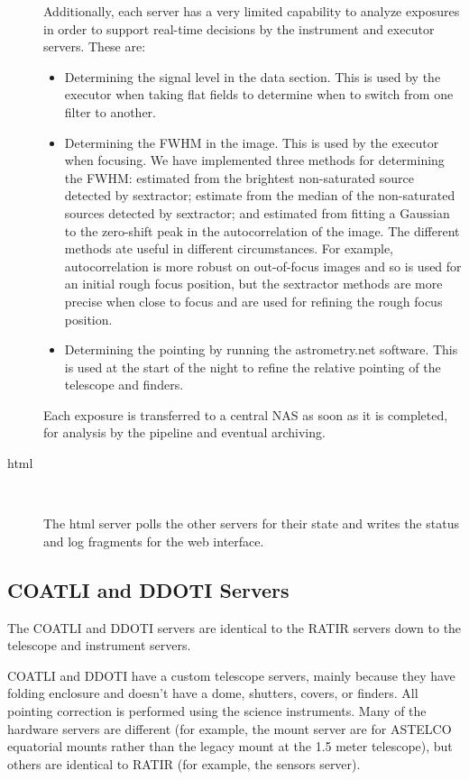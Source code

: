 \documentclass{article}
\newcommand{\server}[1]{{\ttfamily #1}}
\begin{document}
\begin{description}
Additionally, each server has a very limited capability to analyze exposures in order to support real-time decisions by the instrument and executor servers. These are:
\begin{itemize}
\item Determining the signal level in the data section. This is used by the executor when taking flat fields to determine when to switch from one filter to another.
\item Determining the FWHM in the image. This is used by the executor when focusing. We have implemented three methods for determining the FWHM: estimated from the brightest non-saturated source detected by sextractor; estimate from the median of the non-saturated sources detected by sextractor; and estimated from fitting a Gaussian to the zero-shift peak in the autocorrelation of the image. The different methods ate useful in different circumstances. For example, autocorrelation is more robust on out-of-focus images and so is used for an initial rough focus position, but the sextractor methods are more precise when close to focus and are used for refining the rough focus position.
\item Determining the pointing by running the astrometry.net software. This is used at the start of the night to refine the relative pointing of the telescope and finders.
\end{itemize}

Each exposure is transferred to a central NAS as soon as it is completed, for analysis by the pipeline and eventual archiving.

\item[\server{html}]~

The \server{html} server polls the other servers for their state and writes the status and log fragments for the web interface.

\end{description}

\subsection{COATLI and DDOTI Servers}

The COATLI and DDOTI servers are identical to the RATIR servers down to the telescope and instrument servers.

COATLI and DDOTI have a custom telescope servers, mainly because they have folding enclosure and doesn’t have a dome, shutters, covers, or finders. All pointing correction is performed using the science instruments. Many of the hardware servers are different (for example, the mount server are for ASTELCO equatorial mounts rather than the legacy mount at the 1.5 meter telescope), but others are identical to RATIR (for example, the sensors server).
\end{document}
